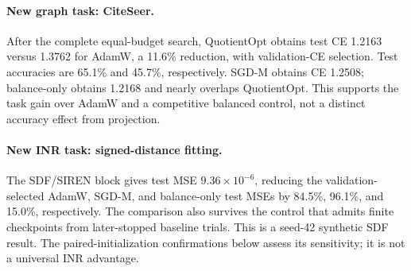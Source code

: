 \paragraph{New graph task: CiteSeer.}
After the complete equal-budget search, QuotientOpt obtains test CE 1.2163 versus 1.3762 for AdamW, a 11.6\% reduction, with validation-CE selection. Test accuracies are 65.1\% and 45.7\%, respectively. SGD-M obtains CE 1.2508; balance-only obtains 1.2168 and nearly overlaps QuotientOpt. This supports the task gain over AdamW and a competitive balanced control, not a distinct accuracy effect from projection.
\paragraph{New INR task: signed-distance fitting.}
The SDF/SIREN block gives test MSE $9.36\!\times\!10^{-6}$, reducing the validation-selected AdamW, SGD-M, and balance-only test MSEs by 84.5\%, 96.1\%, and 15.0\%, respectively. The comparison also survives the control that admits finite checkpoints from later-stopped baseline trials. This is a seed-42 synthetic SDF result. The paired-initialization confirmations below assess its sensitivity; it is not a universal INR advantage.
